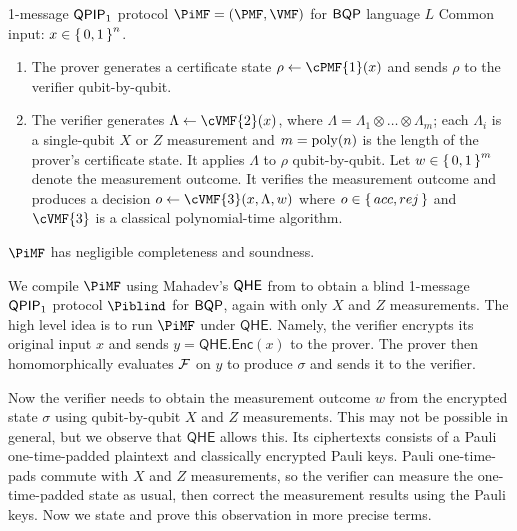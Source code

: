 \begin{protocol}{1-message $\operatorname{\mathsf{QPIP}}_1$ protocol $\PiMF = (\PMF, \VMF)$ for $\operatorname{\mathsf{BQP}}$ language $L$}
	\label{proto:BQP}
	Common input: $x\in\set{0,1}^n$. 
	\begin{enumerate}
		\item The prover generates a certificate state $\rho\leftarrow\cPMF{1}(x)$  and sends $\rho$ to the verifier qubit-by-qubit.
		\item The verifier generates $\Lambda \leftarrow \cVMF{2}(x)$, where $\Lambda=\Lambda_1\otimes\ldots\otimes\Lambda_m$;
			each $\Lambda_i$ is a single-qubit $X$ or $Z$ measurement and $m=\operatorname*{\operatorname{poly}}(n)$ is the length of the prover's certificate state.
			It applies $\Lambda$ to $\rho$ qubit-by-qubit.
			Let $w \in \set{0,1}^m$ denote the measurement outcome.
			It verifies the measurement outcome and produces a decision $o\leftarrow\cVMF{3}(x, \Lambda, w)$ where $o\in\set{acc, rej}$ and $\cVMF{3}$ is a classical polynomial-time algorithm.
	\end{enumerate}
\end{protocol}

$\PiMF$ has negligible completeness and soundness.

We compile $\PiMF$ using Mahadev's $\mathsf{QHE}$ from \cite{mahadev_qfhe} to obtain a blind 1-message $\operatorname{\mathsf{QPIP}}_1$ protocol $\Piblind$ for $\operatorname{\mathsf{BQP}}$, again with only $X$ and $Z$ measurements.
The high level idea is to run $\PiMF$ under $\mathsf{QHE}$.
Namely, the verifier encrypts its original input $x$ and sends $y=\mathsf{QHE.Enc}(x)$ to the prover.
The prover then homomorphically evaluates $\mathcal{F}$ on $y$ to produce $\sigma$ and sends it to the verifier.

Now the verifier needs to obtain the measurement outcome $w$ from the encrypted state $\sigma$ using qubit-by-qubit $X$ and $Z$ measurements.
This may not be possible in general, but we observe that $\mathsf{QHE}$ allows this. 
Its ciphertexts consists of a Pauli one-time-padded plaintext and classically encrypted Pauli keys.
Pauli one-time-pads commute with $X$ and $Z$ measurements, so the verifier can measure the one-time-padded state as usual, then correct the measurement results using the Pauli keys.
Now we state and prove this observation in more precise terms.

